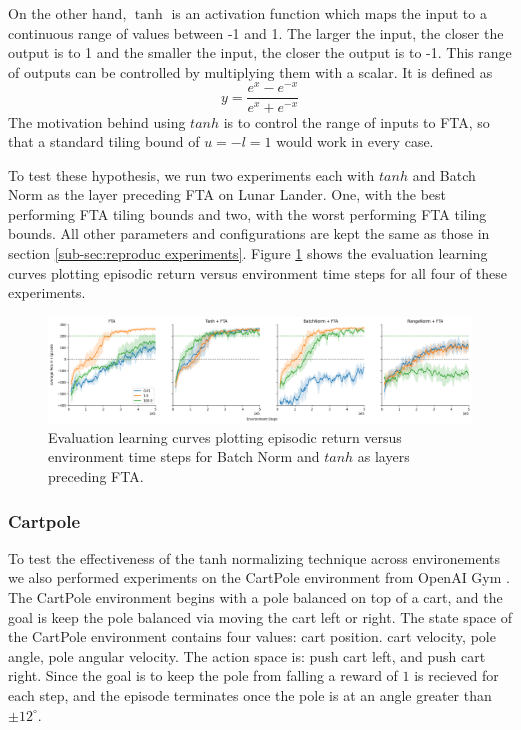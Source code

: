 \documentclass{article}
\begin{document}
On the other hand, $\tanh$ is an activation function which maps the input to a continuous range of values between -1 and 1.
The larger the input, the closer the output is to 1 and the smaller the input, the closer the output is to -1.
This range of outputs can be controlled by multiplying them with a scalar.
It is defined as
 \begin{equation}
    y = \frac{e^x-e^{-x}}{e^x+e^{-x}}
    \label{eq:tanh}
 \end{equation}
The motivation behind using $tanh$ is to control the range of inputs to FTA, so that a standard tiling bound of $u = -l = 1$ would work in every case.

To test these hypothesis, we run two experiments each with $tanh$ and Batch Norm as the layer preceding FTA on Lunar Lander.
One, with the best performing FTA tiling bounds and two, with the worst performing FTA tiling bounds.
All other parameters and configurations are kept the same as those in section \ref{sub-sec:reproduc experiments}.
Figure \ref{fig:bnvtanh} shows the evaluation learning curves plotting episodic return versus environment time steps for all four of these experiments.

\begin{figure}[h]
    \centering
    \includegraphics[width=12cm]{normalizing.png}
    \caption{Evaluation learning curves plotting episodic return versus environment time steps for Batch Norm and $tanh$ as layers preceding FTA.}
    \label{fig:bnvtanh}
\end{figure}

\subsubsection{Cartpole}
To test the effectiveness of the tanh normalizing technique across environements we also performed experiments on the CartPole environment from OpenAI Gym \cite{brockman2016gym}.
The CartPole environment begins with a pole balanced on top of a cart, and the goal is keep the pole balanced via moving the cart left or right.
The state space of the CartPole environment contains four values: cart position. cart velocity, pole angle, pole angular velocity. 
The action space is: push cart left, and push cart right.
Since the goal is to keep the pole from falling a reward of $1$ is recieved for each step, and the episode terminates once the pole is at an angle greater than $\pm 12^\circ$.
\end{document}
